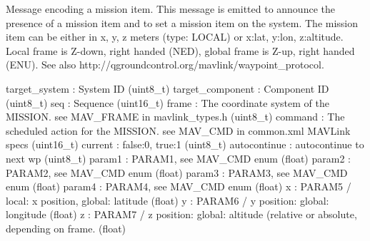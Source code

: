 \begin{DoxyVerb}
\begin{DoxyVerb}
\begin{DoxyVerb}
\begin{DoxyVerb}
\begin{DoxyVerb}Message encoding a mission item. This message is emitted to announce
the presence of a mission item and to set a mission
item on the system. The mission item can be either in
x, y, z meters (type: LOCAL) or x:lat, y:lon,
z:altitude. Local frame is Z-down, right handed (NED),
global frame is Z-up, right handed (ENU). See also
http://qgroundcontrol.org/mavlink/waypoint_protocol.

target_system             : System ID (uint8_t)
target_component          : Component ID (uint8_t)
seq                       : Sequence (uint16_t)
frame                     : The coordinate system of the MISSION. see MAV_FRAME in mavlink_types.h (uint8_t)
command                   : The scheduled action for the MISSION. see MAV_CMD in common.xml MAVLink specs (uint16_t)
current                   : false:0, true:1 (uint8_t)
autocontinue              : autocontinue to next wp (uint8_t)
param1                    : PARAM1, see MAV_CMD enum (float)
param2                    : PARAM2, see MAV_CMD enum (float)
param3                    : PARAM3, see MAV_CMD enum (float)
param4                    : PARAM4, see MAV_CMD enum (float)
x                         : PARAM5 / local: x position, global: latitude (float)
y                         : PARAM6 / y position: global: longitude (float)
z                         : PARAM7 / z position: global: altitude (relative or absolute, depending on frame. (float)\end{DoxyVerb}
 \mbox{\label{classpymavlink_1_1dialects_1_1v10_1_1MAVLink_a02e8ceffd1df8f945d53ff9c5e311f74}} 

\end{DoxyVerb}
\end{DoxyVerb}
\end{DoxyVerb}
\end{DoxyVerb}
